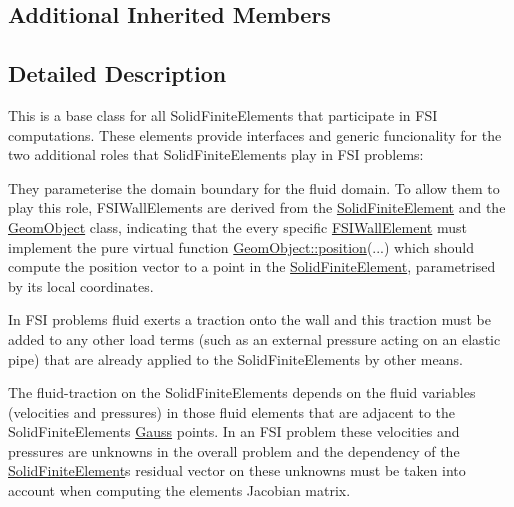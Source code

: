 \subsection*{Additional Inherited Members}


\subsection{Detailed Description}
This is a base class for all Solid\+Finite\+Elements that participate in F\+SI computations. These elements provide interfaces and generic funcionality for the two additional roles that Solid\+Finite\+Elements play in F\+SI problems\+:
\begin{DoxyEnumerate}
\item They parameterise the domain boundary for the fluid domain. To allow them to play this role, F\+S\+I\+Wall\+Elements are derived from the \hyperlink{classoomph_1_1SolidFiniteElement}{Solid\+Finite\+Element} and the \hyperlink{classoomph_1_1GeomObject}{Geom\+Object} class, indicating that the every specific \hyperlink{classoomph_1_1FSIWallElement}{F\+S\+I\+Wall\+Element} must implement the pure virtual function \hyperlink{classoomph_1_1GeomObject_a0d04c9d4667817f3ef24bb660fd56065}{Geom\+Object\+::position}(...) which should compute the position vector to a point in the \hyperlink{classoomph_1_1SolidFiniteElement}{Solid\+Finite\+Element}, parametrised by its local coordinates.
\item In F\+SI problems fluid exerts a traction onto the wall and this traction must be added to any other load terms (such as an external pressure acting on an elastic pipe) that are already applied to the Solid\+Finite\+Elements by other means.
\end{DoxyEnumerate}

The fluid-\/traction on the Solid\+Finite\+Elements depends on the fluid variables (velocities and pressures) in those fluid elements that are adjacent to the Solid\+Finite\+Elements\textquotesingle{} \hyperlink{classoomph_1_1Gauss}{Gauss} points. In an F\+SI problem these velocities and pressures are unknowns in the overall problem and the dependency of the \hyperlink{classoomph_1_1SolidFiniteElement}{Solid\+Finite\+Element}\textquotesingle{}s residual vector on these unknowns must be taken into account when computing the element\textquotesingle{}s Jacobian matrix.

